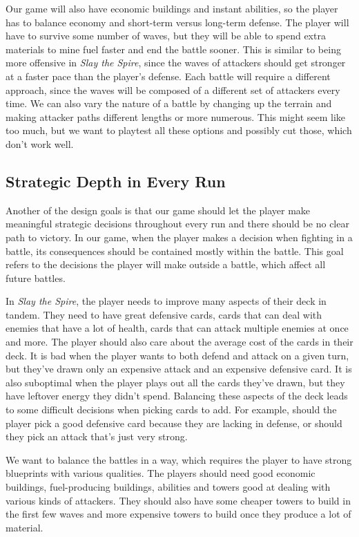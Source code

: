 Our game will also have economic buildings and instant abilities, so the player has to balance economy and short-term versus long-term defense.
The player will have to survive some number of waves, but they will be able to spend extra materials to mine fuel faster and end the battle sooner.
This is similar to being more offensive in \emph{Slay the Spire}, since the waves of attackers should get stronger at a faster pace than the player's defense.
Each battle will require a different approach, since the waves will be composed of a different set of attackers every time.
We can also vary the nature of a battle by changing up the terrain and making attacker paths different lengths or more numerous.
This might seem like too much, but we want to playtest all these options and possibly cut those, which don't work well.

\subsection{Strategic Depth in Every Run} \label{sec:goal-depth-run}

Another of the design goals is that our game should let the player make meaningful strategic decisions throughout every run and there should be no clear path to victory.
In our game, when the player makes a decision when fighting in a battle, its consequences should be contained mostly within the battle.
This goal refers to the decisions the player will make outside a battle, which affect all future battles.

In \emph{Slay the Spire}, the player needs to improve many aspects of their deck in tandem.
They need to have great defensive cards, cards that can deal with enemies that have a lot of health, cards that can attack multiple enemies at once and more.
The player should also care about the average cost of the cards in their deck.
It is bad when the player wants to both defend and attack on a given turn, but they've drawn only an expensive attack and an expensive defensive card.
It is also suboptimal when the player plays out all the cards they've drawn, but they have leftover energy they didn't spend.
Balancing these aspects of the deck leads to some difficult decisions when picking cards to add.
For example, should the player pick a good defensive card because they are lacking in defense, or should they pick an attack that's just very strong.

We want to balance the battles in a way, which requires the player to have strong blueprints with various qualities.
The players should need good economic buildings, fuel-producing buildings, abilities and towers good at dealing with various kinds of attackers.
They should also have some cheaper towers to build in the first few waves and more expensive towers to build once they produce a lot of material.

